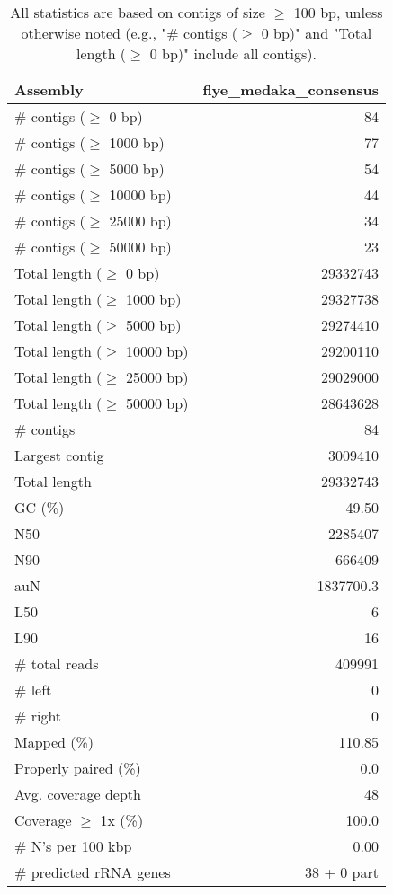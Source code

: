 \documentclass[12pt,a4paper]{article}
\begin{document}
\begin{table}[ht]
\begin{center}
\caption{All statistics are based on contigs of size $\geq$ 100 bp, unless otherwise noted (e.g., "\# contigs ($\geq$ 0 bp)" and "Total length ($\geq$ 0 bp)" include all contigs).}
\begin{tabular}{|l*{1}{|r}|}
\hline
Assembly & flye\_medaka\_consensus \\ \hline
\# contigs ($\geq$ 0 bp) & 84 \\ \hline
\# contigs ($\geq$ 1000 bp) & 77 \\ \hline
\# contigs ($\geq$ 5000 bp) & 54 \\ \hline
\# contigs ($\geq$ 10000 bp) & 44 \\ \hline
\# contigs ($\geq$ 25000 bp) & 34 \\ \hline
\# contigs ($\geq$ 50000 bp) & 23 \\ \hline
Total length ($\geq$ 0 bp) & 29332743 \\ \hline
Total length ($\geq$ 1000 bp) & 29327738 \\ \hline
Total length ($\geq$ 5000 bp) & 29274410 \\ \hline
Total length ($\geq$ 10000 bp) & 29200110 \\ \hline
Total length ($\geq$ 25000 bp) & 29029000 \\ \hline
Total length ($\geq$ 50000 bp) & 28643628 \\ \hline
\# contigs & 84 \\ \hline
Largest contig & 3009410 \\ \hline
Total length & 29332743 \\ \hline
GC (\%) & 49.50 \\ \hline
N50 & 2285407 \\ \hline
N90 & 666409 \\ \hline
auN & 1837700.3 \\ \hline
L50 & 6 \\ \hline
L90 & 16 \\ \hline
\# total reads & 409991 \\ \hline
\# left & 0 \\ \hline
\# right & 0 \\ \hline
Mapped (\%) & 110.85 \\ \hline
Properly paired (\%) & 0.0 \\ \hline
Avg. coverage depth & 48 \\ \hline
Coverage $\geq$ 1x (\%) & 100.0 \\ \hline
\# N's per 100 kbp & 0.00 \\ \hline
\# predicted rRNA genes & 38 + 0 part \\ \hline
\end{tabular}
\end{center}
\end{table}
\end{document}
